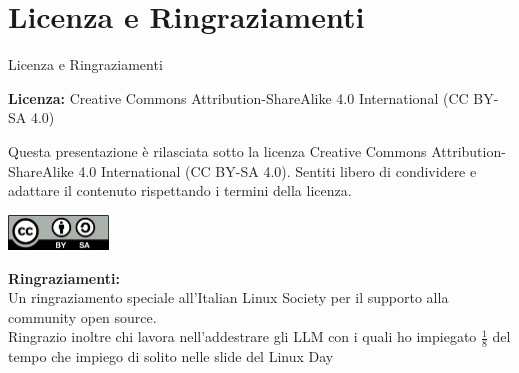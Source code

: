 \documentclass{beamer}
\newcommand{\license}{Creative Commons Attribution-ShareAlike 4.0 International (CC BY-SA 4.0)}
\begin{document}
	\section*{Licenza e Ringraziamenti}
	\begin{frame}{Licenza e Ringraziamenti}
		\begin{center}
			\textbf{Licenza:} \license %
			
			\vspace{1em}
			
			Questa presentazione è rilasciata sotto la licenza \license. Sentiti libero di condividere e adattare il contenuto rispettando i termini della licenza.
			
			\vspace{0.8em}
			
			\includegraphics[width=0.2\textwidth]{images/cc-by-sa.png} %
			
			\vspace{0.8em}
			
			\textbf{Ringraziamenti:}\\Un ringraziamento speciale all'Italian Linux Society per il supporto alla community open source.\\Ringrazio inoltre chi lavora nell'addestrare gli LLM con i quali ho impiegato $\frac{1}{8}$ del tempo che impiego di solito nelle slide del Linux Day
		\end{center}
	\end{frame}
	
\end{document}

